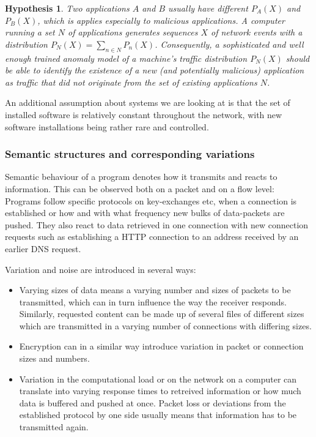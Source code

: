 \documentclass[a4paper,12pt,twoside]{report}
\newtheorem{hypothesis}{Hypothesis}
\begin{document}
\begin{hypothesis}\label{Ass2}
Two applications $A$ and $B$ usually have different $P_A(X)$ and $P_B(X)$, which is applies especially to malicious applications. A computer running a set $N$ of applications %
generates sequences $X$ of network events with a distribution $P_N(X)=\sum_{n\in N}P_n(X)$. Consequently, a sophisticated and well enough trained anomaly model of a machine's traffic distribution $P_N(X)$ should be able to identify the existence of a new (and potentially malicious) application as traffic that did not originate from the set of existing applications $N$.
\end{hypothesis}

An additional assumption about systems we are looking at is that the set of installed software is relatively constant throughout the network, with new software installations being rather rare and controlled. 

\subsubsection{Semantic structures and corresponding variations}

Semantic behaviour of a program denotes how it transmits and reacts to information. This can be observed both on a packet and on a flow level: Programs follow specific protocols on key-exchanges etc, when a connection is established or how and with what frequency new bulks of data-packets are pushed. They also react to data retrieved in one connection with new connection requests such as establishing a HTTP connection to an address received by an earlier DNS request. 

Variation and noise are introduced in several ways:

\begin{itemize}

\item Varying sizes of data means a varying number and sizes of packets to be transmitted, which can in turn influence the way the receiver responds. Similarly, requested content can be made up of several files of different sizes which are transmitted in a varying number of connections with differing sizes.
\item Encryption can in a similar way introduce variation in packet or connection sizes and numbers.
\item Variation in the computational load or on the network on a computer can translate into varying response times to retreived information or how much data is buffered and pushed at once. Packet loss or deviations from the established protocol by one side usually means that information has to be transmitted again.

\end{itemize}
\end{document}
